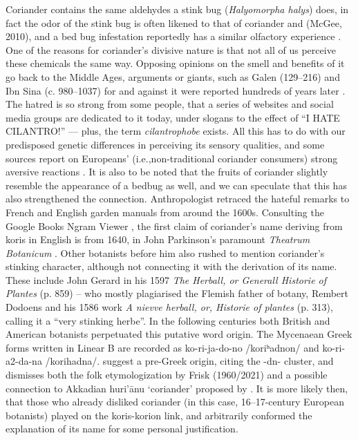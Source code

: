 Coriander contains the same aldehydes a stink bug (\textit{Halyomorpha halys}) does, in fact the odor of the stink bug is often likened to that of coriander and (McGee, 2010), and a bed bug infestation reportedly has a similar olfactory experience \parencite{davidson_oxford_2014}. One of the reasons for coriander’s divisive nature is that not all of us perceive these chemicals the same way. Opposing opinions on the smell and benefits of it go back to the Middle Ages, arguments or giants, such as Galen (129--216) and Ibn Sina (c. 980--1037) for and against it were reported hundreds of years later \parencite[cf.][]{parkinson_theatrum_1640}. The hatred is so strong from some people, that a series of websites and social media groups are dedicated to it today, under slogans to the effect of “I HATE CILANTRO!” — plus, the term \emph{cilantrophobe} exists. All this has to do with our predisposed genetic differences in perceiving its sensory qualities, and some sources report on Europeans’ (i.e.,non-traditional coriander consumers) strong aversive reactions \parencite{eriksson_genetic_2012}. It is also to be noted that the fruits of coriander slightly resemble the appearance of a bedbug as well, and we can speculate that this has also strengthened the connection. Anthropologist \textcite{leach_rehabilitating_2001} retraced the hateful remarks to French and English garden manuals from around the 1600s.
Consulting the Google Books Ngram Viewer \parencite{michel_quantitative_2011}, the first claim of coriander’s name deriving from koris in English is from 1640, in John Parkinson’s paramount \textit{Theatrum Botanicum} \parencite[918-919]{parkinson_theatrum_1640}. Other botanists before him also rushed to mention coriander’s stinking character, although not connecting it with the derivation of its name. These include John Gerard in his 1597 \textit{The Herball, or Generall Historie of Plantes} (p. 859) – who mostly plagiarised the Flemish father of botany, Rembert Dodoens and his 1586 work \textit{A nievve herball, or, Historie of plantes} (p. 313), calling it a “very stinking herbe”. In the following centuries both British and American botanists perpetuated this putative word origin. The Mycenaean Greek forms written in Linear B are recorded as ko-ri-ja-do-no /koriʰadnon/ and ko-ri-a2-da-na /korihadna/. \textcite[754]{beekes_etymological_2010} suggest a pre-Greek origin, citing the -dn- cluster, and dismisses both the folk etymologization by \textcite{frisk_griechisches_2021} Frisk (1960/2021) and a possible connection to Akkadian huri’ānu ‘coriander’ proposed by \textcite{szemerenyi_review_1971}. It is more likely then, that those who already disliked coriander (in this case, 16--17-century European botanists) played on the koris-korion link, and arbitrarily conformed the explanation of its name for some personal justification.
